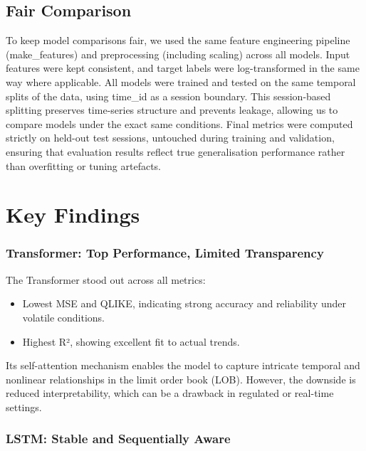 \documentclass[
  letterpaper,
  DIV=11,
  numbers=noendperiod]{scrartcl}
\providecommand{\tightlist}{%
  \setlength{\itemsep}{0pt}\setlength{\parskip}{0pt}}\usepackage{longtable,booktabs,array}
\begin{document}
\subsection{Fair Comparison}\label{fair-comparison}

To keep model comparisons fair, we used the same feature engineering
pipeline (make\_features) and preprocessing (including scaling) across
all models. Input features were kept consistent, and target labels were
log-transformed in the same way where applicable. All models were
trained and tested on the same temporal splits of the data, using
time\_id as a session boundary. This session-based splitting preserves
time-series structure and prevents leakage, allowing us to compare
models under the exact same conditions. Final metrics were computed
strictly on held-out test sessions, untouched during training and
validation, ensuring that evaluation results reflect true generalisation
performance rather than overfitting or tuning artefacts.

\section{Key Findings}\label{key-findings-1}

\subsubsection{Transformer: Top Performance, Limited
Transparency}\label{transformer-top-performance-limited-transparency}

The Transformer stood out across all metrics:

\begin{itemize}
\tightlist
\item
  Lowest MSE and QLIKE, indicating strong accuracy and reliability under
  volatile conditions.
\item
  Highest R², showing excellent fit to actual trends.
\end{itemize}

Its self-attention mechanism enables the model to capture intricate
temporal and nonlinear relationships in the limit order book (LOB).
However, the downside is reduced interpretability, which can be a
drawback in regulated or real-time settings.

\subsubsection{LSTM: Stable and Sequentially
Aware}\label{lstm-stable-and-sequentially-aware}
\end{document}
